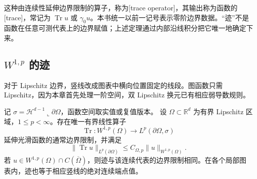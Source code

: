 这种由连续性延伸边界限制的算子，称为[trace operator]，其输出称为函数的[trace]，常记为 \(\operatorname{Tr}u\) 或 \(\gamma_0u\)。本书统一以前一记号表示零阶边界数据。“迹”不是函数在任意可测代表上的边界赋值；上述定理通过内部沿线积分把它唯一地确定下来。

\subsection{\texorpdfstring{\(W^{1,p}\)}{W1,p} 的迹}
\label{b1:subsec:230103}

对于 Lipschitz 边界，竖线改成图表中横向位置固定的线段。图函数只需 Lipschitz，因为本章首先处理一阶空间，双 Lipschitz 换元已有相应弱导数规则。

\begin{theorem}\label{b1:thm:lipschitz-lp-trace}
记 \(\sigma=\mathcal H^{d-1}\llcorner\partial\Omega\)，函数空间取实值或复值版本。
设 \(\Omega\subset\mathbb R^d\) 为有界 Lipschitz 区域，\(1\le p<\infty\)。存在唯一有界线性算子
\[
 \operatorname{Tr}:W^{1,p}(\Omega)\longrightarrow L^p(\partial\Omega,\sigma)
\]
延伸光滑函数的通常边界限制，并满足
\[
 \|\operatorname{Tr}u\|_{L^p(\partial\Omega)}
 \le C_{\Omega,p}\|u\|_{W^{1,p}(\Omega)}.
\]
若 \(u\in W^{1,p}(\Omega)\cap C(\overline\Omega)\)，则迹与该连续代表的边界限制相同。在各个局部图表内，迹也等于相应竖线的绝对连续端点值。
\end{theorem}
